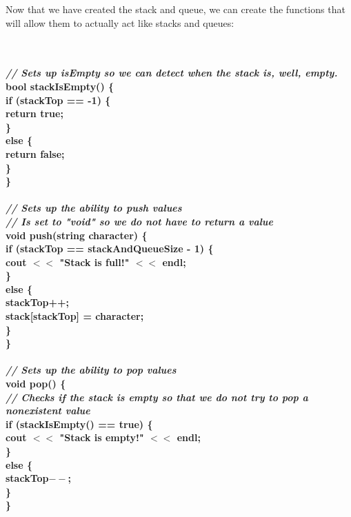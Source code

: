\documentclass{article}
\begin{document}
Now that we have created the stack and queue, we can create the functions that will allow them to actually act like stacks and queues:

\textbf{
\\~\\ \textit{ // Sets up isEmpty so we can detect when the stack is, well, empty.\\ }
bool stackIsEmpty() \{\\
    \indent if (stackTop == -1) \{\\
       \indent \indent return true;\\
    \indent \}\\
    \indent else \{\\
        \indent \indent return false;\\
    \indent \}\\
\}\\
\\
\textit{ // Sets up the ability to push values\\
// Is set to "void" so we do not have to return a value\\ }
void push(string character) \{\\ 
    \indent if (stackTop == stackAndQueueSize - 1) \{\\
        \indent \indent cout $<<$ "Stack is full!" $<<$ endl;\\
    \indent \}\\
    \indent else \{\\
        \indent \indent stackTop++;\\
        \indent \indent stack[stackTop] = character;\\
    \indent \}\\
\}\\
\\
\textit{ // Sets up the ability to pop values\\ }
void pop() \{\\
    \textit{ \indent // Checks if the stack is empty so that we do not try to pop a nonexistent value\\ }
    \indent if (stackIsEmpty() == true) \{\\
        \indent \indent cout $<<$ "Stack is empty!" $<<$ endl;\\
    \indent \}\\
    \indent else \{\\
        \indent \indent stackTop$--$;\\
    \indent \}\\
\} \\~\\ }
\end{document}
